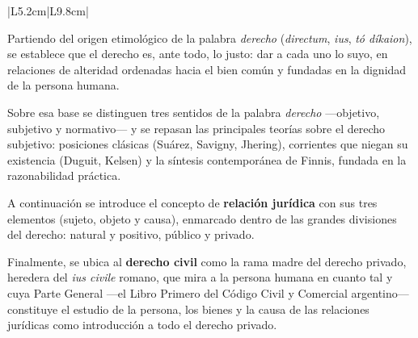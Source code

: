 \documentclass[12pt, a4paper]{report}
\begin{document}
{\begin{longtable}{|L{5.2cm}|L{9.8cm}|}
{  %
  Partiendo del origen etimológico de la palabra \textit{derecho}
  (\textit{directum}, \textit{ius}, \textit{tó díkaion}), se establece que el
  derecho es, ante todo, lo justo: dar a cada uno lo suyo, en relaciones de
  alteridad ordenadas hacia el bien común y fundadas en la dignidad de la
  persona humana.\par\vspace{4pt}
  Sobre esa base se distinguen tres sentidos de la palabra \textit{derecho}
  ---objetivo, subjetivo y normativo--- y se repasan las principales teorías
  sobre el derecho subjetivo: posiciones clásicas (Suárez, Savigny, Jhering),
  corrientes que niegan su existencia (Duguit, Kelsen) y la síntesis
  contemporánea de Finnis, fundada en la razonabilidad práctica.\par\vspace{4pt}
  A continuación se introduce el concepto de \textbf{relación jurídica} con sus
  tres elementos (sujeto, objeto y causa), enmarcado dentro de las grandes
  divisiones del derecho: natural y positivo, público y privado.\par\vspace{4pt}
  Finalmente, se ubica al \textbf{derecho civil} como la rama madre del derecho
  privado, heredera del \textit{ius civile} romano, que mira a la persona
  humana en cuanto tal y cuya Parte General ---el Libro Primero del Código Civil
  y Comercial argentino--- constituye el estudio de la persona, los bienes y la
  causa de las relaciones jurídicas como introducción a todo el derecho privado.
  \vspace{5pt}
} \\
\hline
\end{longtable}
}
\end{document}
